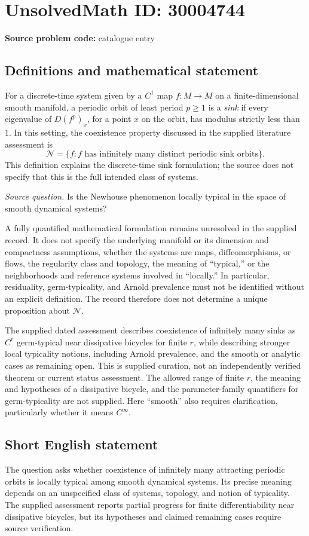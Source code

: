 \documentclass[11pt]{article}
\begin{document}
\section*{UnsolvedMath ID: 30004744}
\textbf{Source problem code:} catalogue entry
\subsection{Definitions and mathematical statement}
For a discrete-time system given by a \(C^1\) map \(f\colon M\to M\) on a finite-dimensional smooth manifold, a periodic orbit of least period \(p\geq 1\) is a \emph{sink} if every eigenvalue of \(D(f^p)_x\), for a point \(x\) on the orbit, has modulus strictly less than \(1\). In this setting, the coexistence property discussed in the supplied literature assessment is
\[
\mathcal N=\{f: f\text{ has infinitely many distinct periodic sink orbits}\}.
\]
This definition explains the discrete-time sink formulation; the source does not specify that this is the full intended class of systems.

\emph{Source question.} Is the Newhouse phenomenon locally typical in the space of smooth dynamical systems?

A fully quantified mathematical formulation remains unresolved in the supplied record. It does not specify the underlying manifold or its dimension and compactness assumptions, whether the systems are maps, diffeomorphisms, or flows, the regularity class and topology, the meaning of ``typical,'' or the neighborhoods and reference systems involved in ``locally.'' In particular, residuality, germ-typicality, and Arnold prevalence must not be identified without an explicit definition. The record therefore does not determine a unique proposition about \(\mathcal N\).

The supplied dated assessment describes coexistence of infinitely many sinks as \(C^r\) germ-typical near dissipative bicycles for finite \(r\), while describing stronger local typicality notions, including Arnold prevalence, and the smooth or analytic cases as remaining open. This is supplied curation, not an independently verified theorem or current status assessment. The allowed range of finite \(r\), the meaning and hypotheses of a dissipative bicycle, and the parameter-family quantifiers for germ-typicality are not supplied. Here ``smooth'' also requires clarification, particularly whether it means \(C^\infty\).
\subsection{Short English statement}
The question asks whether coexistence of infinitely many attracting periodic orbits is locally typical among smooth dynamical systems. Its precise meaning depends on an unspecified class of systems, topology, and notion of typicality. The supplied assessment reports partial progress for finite differentiability near dissipative bicycles, but its hypotheses and claimed remaining cases require source verification.
\end{document}
